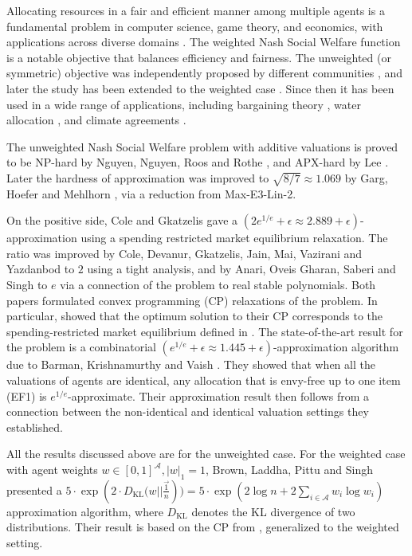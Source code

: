 \documentclass[10pt,a4paper]{article}
\theoremstyle{definition}
\theoremstyle{plain}
\newcommand\calA{{\mathcal{A}}}
\begin{document}
Allocating resources in a fair and efficient manner among multiple agents is a fundamental problem in computer science, game theory, and economics, with applications across diverse domains \cite{KN79, You94, BT96, RW98, Mou04, BT05,  Rot15, BCE16}. The weighted Nash Social Welfare function is a notable objective that balances efficiency and fairness. The unweighted (or symmetric) objective was independently proposed by different communities \cite{Nas50, Kel97, Var74}, and later the study has been extended to the weighted case \cite{HS72, Kal77}. Since then it has been used in a wide range of applications, including bargaining theory \cite{LV07, CM10, Tho86}, water allocation \cite{HLZ13, DHY18}, and climate agreements \cite{YvIW17}.

The unweighted Nash Social Welfare problem with additive valuations is proved to be NP-hard by Nguyen, Nguyen, Roos and Rothe \cite{NNRR12}, and APX-hard by Lee \cite{Lee15}.  Later the hardness of approximation was improved to $\sqrt{8/7} \approx 1.069$ by Garg, Hoefer and Mehlhorn \cite{GHM23}, via a reduction from Max-E3-Lin-2.

On the positive side, Cole and Gkatzelis \cite{CG15} gave a $(2e^{1/e} + \epsilon\approx 2.889 + \epsilon)$-approximation using a spending restricted market equilibrium relaxation. The ratio was improved by Cole, Devanur, Gkatzelis, Jain, Mai, Vazirani and Yazdanbod \cite{CDG17} to $2$ using a tight analysis, and by Anari, Oveis Gharan, Saberi and Singh \cite{AGS17} to $e$ via a connection of the problem to real stable polynomials. Both papers formulated convex programming (CP) relaxations of the problem. In particular, \cite{CDG17} showed that the optimum solution to their CP corresponds to the spending-restricted market equilibrium defined in \cite{CG15}.  The state-of-the-art result for the problem is a combinatorial $(e^{1/e}+\epsilon\approx 1.445 + \epsilon)$-approximation algorithm due to Barman, Krishnamurthy and Vaish \cite{BKV18}. They showed that when all the valuations of agents are identical, any allocation that is envy-free up to one item (EF1) is $e^{1/e}$-approximate.  Their approximation result then follows from a connection between the non-identical and identical valuation settings they established. 

All the results discussed above are for the unweighted case.  For the weighted case with agent weights $w \in [0, 1]^\calA, |w|_1 = 1$, Brown, Laddha, Pittu and Singh \cite{BLP24} presented a $5 \cdot \exp(2 \cdot D_{\text{KL}}\Big(w || \frac{\vec{1}}{n})\Big) = 5\cdot \exp(2\log n + 2\sum_{i \in \calA} w_i \log w_i)$ approximation algorithm, where $D_{\text{KL}}$ denotes the KL divergence of two distributions. Their result is based on the CP from \cite{CDG17}, generalized to the weighted setting. 
\smallskip
\end{document}
